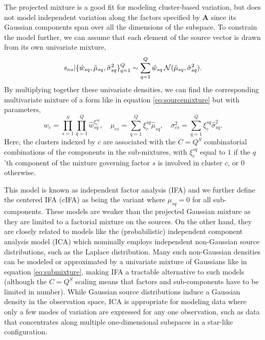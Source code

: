 \documentclass{article}
\newcommand{\mix}{\bm{A}}
\newcommand{\source}{s}
\newcommand{\mean}{\mu}
\newcommand{\scale}{\sigma}
\newcommand{\scalesq}{\scale^2}
\newcommand{\weight}{w}
\newcommand{\subweight}{\hat{w}}
\newcommand{\submean}{\hat{\mu}}
\newcommand{\subscale}{\hat{\sigma}}
\newcommand{\subscalesq}{\subscale^2}
\newcommand{\compweight}{{\weight}}
\newcommand{\compmean}{{\mean}}
\newcommand{\numfactor}{S}
\newcommand{\numcluster}{C}
\newcommand{\numifa}{Q}
\newcommand{\icluster}{c}
\newcommand{\iifa}{q}
\newcommand{\ifactor}{s}
\begin{document}
The projected mixture is a good fit for modeling cluster-based variation, but does not model independent variation along the factors specified by $\mix$ since its Gaussian components span over all the dimensions of the subspace. To constrain the model further, we can assume that each element of the source vector is drawn from its own univariate mixture,
\begin{equation}
\label{eq:submixture}
\source_{n\ifactor}\cond \lbrace \subweight_{\ifactor\iifa},\submean_{\ifactor\iifa},\subscalesq_{\ifactor\iifa}\rbrace_{\iifa=1}^{\numifa} \sim\sum_{\iifa=1}^{\numifa}\subweight_{\ifactor\iifa}\gaussrnd(\submean_{\ifactor\iifa},\subscalesq_{\ifactor\iifa}).
\end{equation}
By multiplying together these univariate densities, we can find the corresponding multivariate mixture of a form like in equation \eqref{eq:sourcemixture} but with parameters,
\begin{equation}
\compweight_{\icluster}=\prod_{\ifactor=1}^{\numfactor}\prod_{\iifa=1}^{\numifa}\subweight_{\ifactor\iifa}^{\xi_{\icluster}^{\ifactor\iifa}},\quad \compmean_{\icluster\ifactor}=\sum_{\iifa=1}^{\numifa}\xi_{\icluster}^{\ifactor\iifa}\submean_{\ifactor\iifa},\quad \scalesq_{\icluster\ifactor}=\sum_{\iifa=1}^{\numifa}\xi_{\icluster}^{\ifactor\iifa}\subscalesq_{\ifactor\iifa}. 
\end{equation}
Here, the clusters indexed by $\icluster$ are associated with the 
$\numcluster=\numifa^{\numfactor}$ combinatorial combinations of the components in the sub-mixtures, with $\xi_{\icluster}^{\ifactor\iifa}$ equal to $1$ if the $\iifa$'th component of the mixture governing factor $\ifactor$ is involved in cluster $\icluster$, or $0$ otherwise. 

This model is known as independent factor analysis (IFA) and we further define the centered IFA (cIFA) as being the variant where $\mean_{\ifactor\iifa}=0$ for all sub-components. These models are weaker than the projected Gaussian mixture as they are limited to a factorial mixture on the sources. On the other hand, they are closely related to models like the (probabilistic) independent component analysis model (ICA) which nominally employs independent non-Gaussian source distributions, such as the Laplace distribution. Many such non-Gaussian densities can be modeled or approximated by a univariate mixture of Gaussians like in equation \eqref{eq:submixture}, making IFA a tractable alternative to such models (although the $\numcluster=\numifa^{\numfactor}$ scaling means that factors and sub-components have to be limited in number). While Gaussian source distributions induce a Gaussian density in the observation space, ICA is appropriate for modeling data where only a few modes of variation are expressed for any one observation, such as data that concentrates along multiple one-dimensional subspaces in a star-like configuration.
\end{document}
